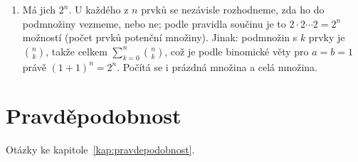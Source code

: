 \begin{enumerate}[label=\textbf{\arabic*.}, leftmargin=*, itemsep=0.8em]
  \item {}
  Má jich $2^n$. U každého z $n$ prvků se nezávisle rozhodneme, zda ho do podmnožiny vezmeme, nebo ne; podle pravidla součinu je to $2\cdot 2\cdots 2 = 2^n$ možností (počet prvků potenční množiny). Jinak: podmnožin s $k$ prvky je $\binom{n}{k}$, takže celkem $\sum_{k=0}^{n}\binom{n}{k}$, což je podle binomické věty pro $a = b = 1$ právě ${(1 + 1)}^n = 2^n$. Počítá se i prázdná množina a celá množina.
\end{enumerate}

\section{Pravděpodobnost}

Otázky ke kapitole~\ref{kap:pravdepodobnost}.

